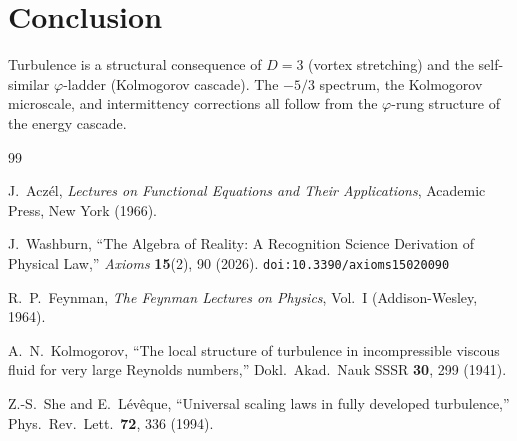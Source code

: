 \documentclass[12pt,a4paper]{article}
\theoremstyle{definition}
\theoremstyle{remark}
\begin{document}
\section{Conclusion}
\label{sec:conclusion}

Turbulence is a structural consequence of $D = 3$ (vortex
stretching) and the self-similar $\varphi$-ladder (Kolmogorov
cascade).  The $-5/3$ spectrum, the Kolmogorov microscale, and
intermittency corrections all follow from the $\varphi$-rung
structure of the energy cascade.

\begin{thebibliography}{99}

J.~Acz\'el, \emph{Lectures on Functional Equations and Their Applications},
Academic Press, New York (1966).

J.~Washburn, ``The Algebra of Reality: A Recognition Science Derivation
of Physical Law,'' \emph{Axioms} \textbf{15}(2), 90 (2026).
\texttt{doi:10.3390/axioms15020090}

R.~P.~Feynman, \textit{The Feynman Lectures on Physics}, Vol.~I
(Addison-Wesley, 1964).

A.~N.~Kolmogorov, ``The local structure of turbulence in
incompressible viscous fluid for very large Reynolds numbers,''
Dokl.\ Akad.\ Nauk SSSR \textbf{30}, 299 (1941).

Z.-S.~She and E.~L\'ev\^eque, ``Universal scaling laws in fully
developed turbulence,'' Phys.\ Rev.\ Lett.\ \textbf{72}, 336
(1994).

\end{thebibliography}
\end{document}
